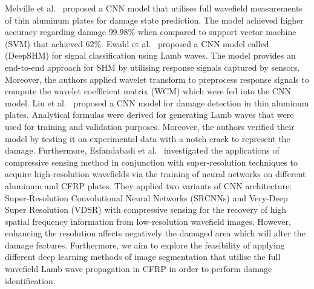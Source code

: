 Melville et al.~\cite{Melville2018} proposed a CNN model that utilises full wavefield measurements of thin aluminum plates for damage state prediction.
The model achieved higher accuracy regarding damage \(99.98\%\) when compared to support vector machine (SVM) that achieved \(62\%\).
Ewald et al.~\cite{Ewald2019} proposed a CNN model called (DeepSHM) for signal classification using Lamb waves.
The model provides an end-to-end approach for SHM by utilising response signals captured by sensors.
Moreover, the authors applied wavelet transform to preprocess response signals to compute the wavelet coefficient matrix (WCM) which were fed into the CNN model.
Liu et al.~\cite{Liu2020} proposed a CNN model for damage detection in thin aluminum plates.
Analytical formulas were derived for generating Lamb waves that were used for training and validation purposes.
Moreover, the authors verified their model by testing it on experimental data with a notch crack to represent the damage.
Furthermore, Esfandabadi et al.~\cite{esfandabadideep} investigated the applications of compressive sensing method in conjunction with super-resolution techniques to acquire high-resolution wavefields via the training of neural networks on different aluminum and CFRP plates. 
They applied two variants of CNN architecture: Super-Resolution Convolutional Neural Networks (SRCNNs) and Very-Deep Super Resolution (VDSR) with compressive sensing for the recovery of high spatial frequency information from low-resolution wavefield images. 
However, enhancing the resolution affects negatively the damaged area which will alter the damage features.
Furthermore, we aim to explore the feasibility of applying different deep learning methods of image segmentation that utilise the full wavefield Lamb wave propagation in CFRP in order to perform damage identification.